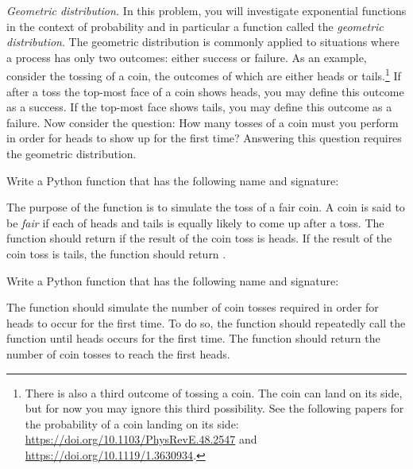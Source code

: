 \documentclass[a4paper,oneside,12pt]{article}
\begin{document}
\begin{problem}
\item\emph{Geometric distribution.}
  In this problem, you will investigate exponential functions in the
  context of probability and in particular a function called the
  \emph{geometric distribution}.  The geometric distribution is
  commonly applied to situations where a process has only two
  outcomes: either success or failure.  As an example, consider the
  tossing of a coin, the outcomes of which are either heads or
  tails.\footnote{
    There is also a third outcome of tossing a coin.  The coin can
    land on its side, but for now you may ignore this third
    possibility.  See the following papers for the probability of a
    coin landing on its side:
    \url{https://doi.org/10.1103/PhysRevE.48.2547} and
    \url{https://doi.org/10.1119/1.3630934}.
  }
  If after a toss the top-most face of a coin shows heads, you may
  define this outcome as a success.  If the top-most face shows tails,
  you may define this outcome as a failure.  Now consider the
  question: How many tosses of a coin must you perform in order for
  heads to show up for the first time?  Answering this question
  requires the geometric distribution.
  \begin{packedenum}
  \item\label{subprob:coin_simulation_fair_coin}
    Write a Python function that has the following name and signature:
    \begin{center}
    \end{center}
    The purpose of the function  is to simulate the
    toss of a fair coin.  A coin is said to be \emph{fair} if each of
    heads and tails is equally likely to come up after a toss.  The
    function should return  if the result of the coin toss
    is heads.  If the result of the coin toss is tails, the function
    should return .

  \item\label{subprob:coin_simulation_time_to_heads}
    Write a Python function that has the following name and signature:
    \begin{center}
    \end{center}
    The function  should simulate the number
    of coin tosses required in order for heads to occur for the first
    time.  To do so, the function should repeatedly call the function
     until heads occurs for the first time.  The
    function  should return the number of coin
    tosses to reach the first heads.


\end{packedenum}
\end{problem}
\end{document}
